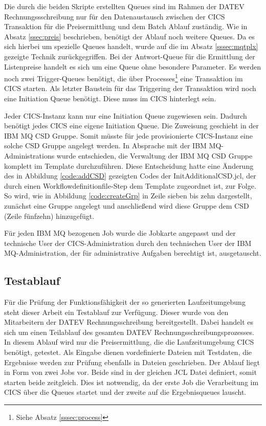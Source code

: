 Die durch die beiden Skripte erstellten Queues sind im Rahmen der DATEV Rechnungssschreibung nur für den Datenaustausch zwischen der CICS Transaktion für die Preisermittlung und dem Batch Ablauf zuständig.
Wie in Absatz \ref{ssec:preis} beschrieben, benötigt der Ablauf noch weitere Queues.
Da es sich hierbei um spezielle Queues handelt, wurde auf die im Absatz \ref{sssec:mqtplx} gezeigte Technik zurückgegriffen.
Bei der Antwort-Queue für die Ermittlung der Listenpreise handelt es sich um eine Queue ohne besondere Parameter.
Es werden noch zwei Trigger-Queues benötigt, die über Processes\footnote{Siehe Absatz \ref{sssec:process}} eine Transaktion im CICS starten.
Als letzter Baustein für das Triggering der Transaktion wird noch eine Initiation Queue benötigt.
Diese muss im CICS hinterlegt sein.

Jeder CICS-Instanz kann nur eine Initiation Queue zugewiesen sein.
Dadurch benötigt jedes CICS eine eigene Initiation Queue.
Die Zuweisung geschieht in der IBM MQ CSD Gruppe.
Somit müsste für jede provisionierte CICS-Instanz eine solche CSD Gruppe angelegt werden.
In Absprache mit der IBM MQ-Administrations wurde entschieden, die Verwaltung der IBM MQ CSD Gruppe komplett im Template durchzuführen.
Diese Entscheidung hatte eine Änderung des in Abbildung \ref{code:addCSD} gezeigten Codes der \glqq InitAdditionalCSD.jcl\grqq, der durch einen Workflowdefinitionfile-Step dem Template zugeordnet ist, zur Folge.
So wird, wie in Abbildung \ref{code:createGrp} in Zeile sieben bis zehn dargestellt, zunächst eine Gruppe angelegt und anschließend wird diese Gruppe dem CSD (Zeile fünfzehn) hinzugefügt.

\begin{minipage}{\linewidth}

\end{minipage}

Für jeden IBM MQ bezogenen Job wurde die Jobkarte angepasst und der technische User der CICS-Administration durch den technischen User der IBM MQ-Administration, der für administrative Aufgaben berechtigt ist, ausgetauscht.

\subsection{Testablauf}
Für die Prüfung der Funktionsfähigkeit der so generierten Laufzeitumgebung steht dieser Arbeit ein Testablauf zur Verfügung.
Dieser wurde von den Mitarbeitern der DATEV Rechnungsschreibung bereitgestellt.
Dabei handelt es sich um einen Teilablauf des gesamten DATEV Rechnungsschreibungsprozesses.
In diesem Ablauf wird nur die Preisermittlung, die die Laufzeitumgebung CICS benötigt, getestet.
Als Eingabe dienen vordefinierte Dateien mit Testdaten, die Ergebnisse werden zur Prüfung ebenfalls in Dateien geschrieben.
Der Ablauf liegt in Form von zwei Jobs vor.
Beide sind in der gleichen JCL Datei definiert, somit starten beide zeitgleich. 
Dies ist notwendig, da der erste Job die Verarbeitung im CICS über die Queues startet und der zweite auf die Ergebnisqueues lauscht.

